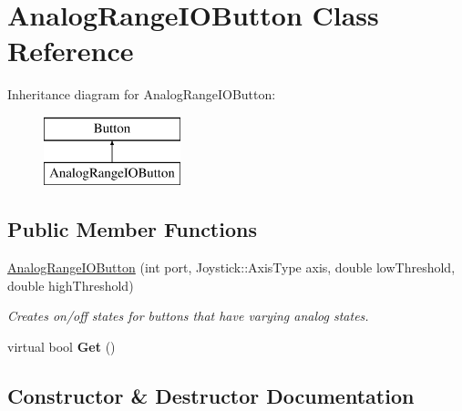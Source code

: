\hypertarget{class_analog_range_i_o_button}{}\section{Analog\+Range\+I\+O\+Button Class Reference}
\label{class_analog_range_i_o_button}
Inheritance diagram for Analog\+Range\+I\+O\+Button\+:\begin{figure}[H]
\begin{center}
\leavevmode
\includegraphics[height=2.000000cm]{class_analog_range_i_o_button}
\end{center}
\end{figure}
\subsection*{Public Member Functions}
\begin{DoxyCompactItemize}
\item 
\hyperlink{class_analog_range_i_o_button_ad99b0723a6b5754b442b8112c11f6197}{Analog\+Range\+I\+O\+Button} (int port, Joystick\+::\+Axis\+Type axis, double low\+Threshold, double high\+Threshold)
\begin{DoxyCompactList}\small\item\em Creates on/off states for buttons that have varying analog states. \end{DoxyCompactList}\item 
\hypertarget{class_analog_range_i_o_button_aadd957fdd7b12f3f3a8dbe5a918400c1}{}virtual bool {\bfseries Get} ()\label{class_analog_range_i_o_button_aadd957fdd7b12f3f3a8dbe5a918400c1}

\end{DoxyCompactItemize}


\subsection{Constructor \& Destructor Documentation}
\hypertarget{class_analog_range_i_o_button_ad99b0723a6b5754b442b8112c11f6197}{}
